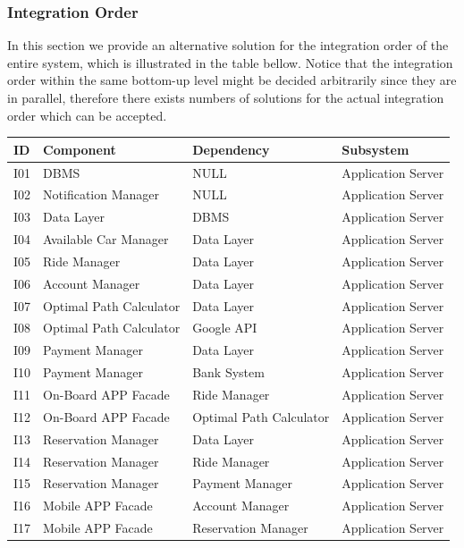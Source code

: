 \documentclass[a4paper,11pt]{article}
\begin{document}
	\subsubsection{Integration Order}
	In this section we provide an alternative solution for the integration order of the entire system, which is illustrated in the table bellow. Notice that the integration order within the same bottom-up level might be decided arbitrarily since they are in parallel, therefore there exists numbers of solutions for the actual integration order which can be accepted. 	
\begin{table}[H]
\begin{center}
\renewcommand\arraystretch{1.5}
\begin{tabular}{|p{.5cm}|p{4cm}|p{4.5cm}|p{3.5cm}|}
 \hline
ID& Component&Dependency&Subsystem\\
 \hline
I01& DBMS&NULL&Application Server \\
 \hline
I02& Notification Manager&NULL&Application Server  \\
 \hline
I03& Data Layer&DBMS&Application Server \\
 \hline
I04& Available Car Manager&Data Layer&Application Server \\
 \hline
I05& Ride Manager&Data Layer&Application Server \\
 \hline
I06& Account Manager& Data Layer& Application Server \\
 \hline
I07& Optimal Path Calculator& Data Layer& Application Server \\
 \hline
 I08& Optimal Path Calculator& Google API& Application Server \\
 \hline
I09& Payment Manager&Data Layer&Application Server\\
 \hline
 I10& Payment Manager&Bank System&Application Server\\
 \hline
I11& On-Board APP Facade&Ride Manager&Application Server \\
 \hline
 I12& On-Board APP Facade&Optimal Path Calculator&Application Server \\
 \hline
I13& Reservation Manager&Data Layer&Application Server\\
 \hline
 I14& Reservation Manager&Ride Manager&Application Server\\
 \hline
 I15& Reservation Manager&Payment Manager&Application Server\\
 \hline
 I16& Mobile APP Facade&Account Manager&Application Server \\
 \hline
 I17&  Mobile APP Facade&Reservation Manager&Application Server\\

\end{tabular}
\end{center}
\end{table}
\end{document}
